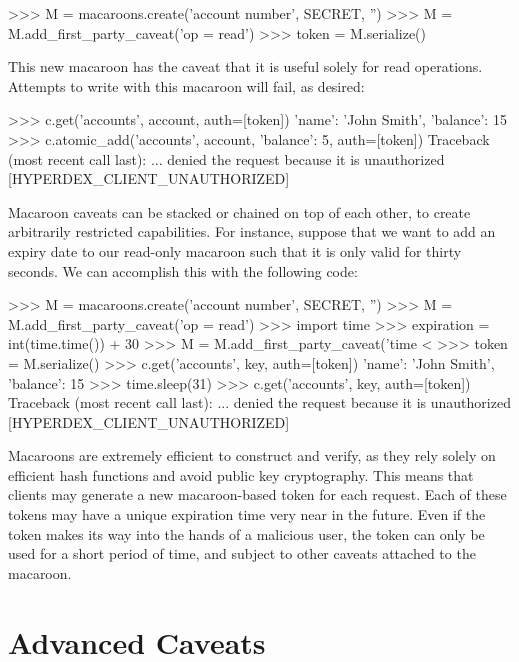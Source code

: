 \begin{pythoncode}
>>> M = macaroons.create('account number', SECRET, '')
>>> M = M.add_first_party_caveat('op = read')
>>> token = M.serialize()
\end{pythoncode}

This new macaroon has the caveat that it is useful solely for read operations.
Attempts to write with this macaroon will fail, as desired:

\begin{pythoncode}
>>> c.get('accounts', account, auth=[token])
{'name': 'John Smith', 'balance': 15}
>>> c.atomic_add('accounts', account, {'balance': 5}, auth=[token])
Traceback (most recent call last):
... denied the request because it is unauthorized [HYPERDEX_CLIENT_UNAUTHORIZED]
\end{pythoncode}

Macaroon caveats can be stacked or chained on top of each other, to create arbitrarily 
restricted capabilities. For instance, suppose that we want to add an expiry date to 
our read-only macaroon such that it is only valid for thirty seconds. We can accomplish
this with the following code:

\begin{pythoncode}
>>> M = macaroons.create('account number', SECRET, '')
>>> M = M.add_first_party_caveat('op = read')
>>> import time
>>> expiration = int(time.time()) + 30
>>> M = M.add_first_party_caveat('time < %
>>> token = M.serialize()
>>> c.get('accounts', key, auth=[token])
{'name': 'John Smith', 'balance': 15}
>>> time.sleep(31)
>>> c.get('accounts', key, auth=[token])
Traceback (most recent call last):
... denied the request because it is unauthorized [HYPERDEX_CLIENT_UNAUTHORIZED]
\end{pythoncode}

Macaroons are extremely efficient to construct and verify, as they rely solely on 
efficient hash functions and avoid public key cryptography. This means that clients
may generate a new macaroon-based token for each request.  Each of these tokens
may have a unique expiration time very near in the future.  Even if the token
makes its way into the hands of a malicious user, the token can only be used for
a short period of time, and subject to other caveats attached to the macaroon.

\section{Advanced Caveats}

